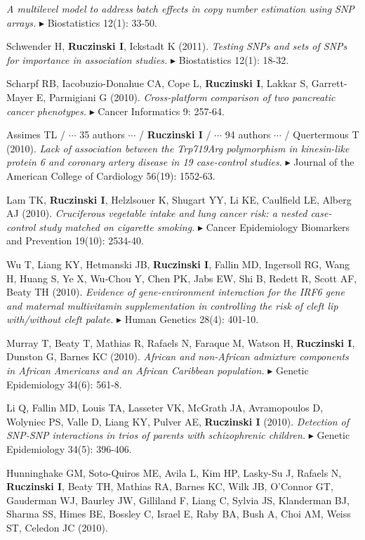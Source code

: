 \documentclass[10pt]{article}
\newcommand{\mine}{
  \addtocounter{enumi}{1}
\item[\fcolorbox{white}{grey}{\color{white} \tiny \arabic{enumi}}]
}
\newcommand{\dg}[1]{{\color{black} $\blacktriangleright$ {#1}}}
\begin{document}
{\it A multilevel model to address batch effects in copy number estimation using SNP arrays.} 
\dg{Biostatistics} 12(1): 33-50. 
\item
Schwender H, {\bf Ruczinski I}, Ickstadt K (2011). 
{\it Testing SNPs and sets of SNPs for importance in association studies.} 
\dg{Biostatistics} 12(1): 18-32. 
\item
Scharpf RB, Iacobuzio-Donahue CA, Cope L, {\bf Ruczinski I}, Lakkar S, Garrett-Mayer E, Parmigiani G (2010).
{\it Cross-platform comparison of two pancreatic cancer phenotypes.}
\dg{Cancer Informatics} 9: 257-64.
\item
Assimes TL / $\cdots$ 35 authors $\cdots$ / {\bf Ruczinski I} / $\cdots$ 94 authors $\cdots$ / Quertermous T (2010).
{\it Lack of association between the Trp719Arg polymorphism in kinesin-like protein 6 and coronary artery disease in 19 case-control studies.}
\dg{Journal of the American College of Cardiology} 56(19): 1552-63.
\item
Lam TK, {\bf Ruczinski I}, Helzlsouer K, Shugart YY, Li KE, Caulfield LE, Alberg AJ (2010).
{\it Cruciferous vegetable intake and lung cancer risk: a nested case-control study matched on cigarette smoking.}
\dg{Cancer Epidemiology Biomarkers and Prevention} 19(10): 2534-40.
\item 
Wu T, Liang KY, Hetmanski JB, {\bf Ruczinski I}, Fallin MD, Ingersoll RG, Wang H, Huang S, Ye X, Wu-Chou Y, Chen PK, Jabs EW, Shi B, Redett R, Scott AF, Beaty TH (2010).
{\it Evidence of gene-environment interaction for the IRF6 gene and maternal multivitamin supplementation in controlling the risk of cleft lip with/without cleft palate.} 
\dg{Human Genetics} 28(4): 401-10.
\item
Murray T, Beaty T, Mathias R, Rafaels N, Faraque M, Watson H, {\bf Ruczinski I}, Dunston G, Barnes KC (2010).
{\it African and non-African admixture components in African Americans and an African Caribbean population.}
\dg{Genetic Epidemiology} 34(6): 561-8.
\mine
Li Q, Fallin MD, Louis TA, Lasseter VK, McGrath JA, Avramopoulos D, Wolyniec PS, Valle D, Liang KY, Pulver AE, {\bf Ruczinski I} (2010).
{\it Detection of SNP-SNP interactions in trios of parents with schizophrenic children.}
\dg{Genetic Epidemiology} 34(5): 396-406. 
\item
Hunninghake GM, Soto-Quiros ME, Avila L, Kim HP, Lasky-Su J, Rafaels N, {\bf Ruczinski I}, Beaty TH, Mathias RA, Barnes KC, Wilk JB, O’Connor GT, Gauderman WJ, Baurley JW, Gilliland F, Liang C, Sylvia JS, Klanderman BJ, Sharma SS, Himes BE, Bossley C, Israel E, Raby BA, Bush A, Choi AM, Weiss ST, Celedon JC (2010).
\end{document}
